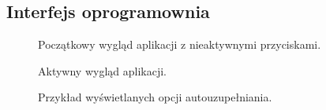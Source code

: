 \documentclass[twoside,a4paper]{book}
\begin{document}
\subsection{Interfejs oprogramownia}
\begin{figure}[!h]
		\centering
		\caption{Początkowy wygląd aplikacji z nieaktywnymi przyciskami. }
		\label{fig:add}
\end{figure}
\begin{figure}[!h]
		\centering
		\caption{Aktywny wygląd aplikacji. }
		\label{fig:add}
\end{figure}
\begin{figure}[!h]
		\centering
		\caption{Przykład wyświetlanych opcji autouzupełniania. }
		\label{fig:add}
\end{figure}
\end{document}
